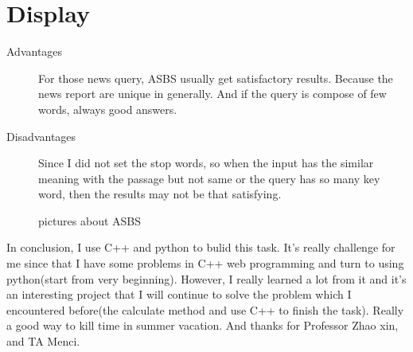 \documentclass[a4paper]{article}
\begin{document}
\section {Display}
\begin{description}
\item[Advantages] For those news query, ASBS usually get satisfactory results. Because the news report are unique in generally. And if the query is compose of few words, always good answers.
\item[Disadvantages] Since I did not set the stop words, so when the input has the similar meaning with the passage but not same or the query has so many key word, then the results may not be that satisfying.
\end{description}
\begin{figure} [H]
 \centering
 \caption{pictures about ASBS}
 \label{f:pictures about ASBS}
\end{figure}
In conclusion, I use C++ and python to bulid this task. It's really challenge for me since that I have some problems in C++ web programming and turn to using python(start from very beginning). However, I really learned a lot from it and it's an interesting project that I will continue to solve the problem which I encountered before(the calculate method and use C++ to finish the task). Really a good way to kill time in summer vacation. And thanks for Professor Zhao xin, and TA Menci.
\end{document}
